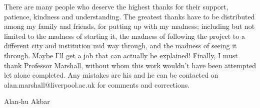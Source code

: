 There are many people who deserve the highest thanks for their support, patience, kindness and understanding.
The greatest thanks have to be distributed among my family and friends, for putting up with my madness; including but not limited to the madness of starting it, the madness of following the project to a different city and institution mid way through, and the madness of seeing it through.
Maybe I'll get a job that can actually be explained! 
Finally, I must thank Professor Marshall, without whom this work wouldn't have been attempted let alone completed.
Any mistakes are his and he can be contacted on alan.marshall@liverpool.ac.uk for comments and corrections.

{\centering
Alan-hu Akbar\par
}
